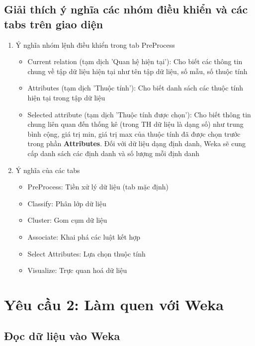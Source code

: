 \documentclass[a4paper, 12pt]{article}
\begin{document}
\subsection{Giải thích ý nghĩa các nhóm điều khiển và các tabs trên giao diện}
\begin{enumerate}
    \item Ý nghĩa nhóm lệnh điều khiển trong tab PreProcess
    \begin{itemize}
        \item Current relation (tạm dịch 'Quan hệ hiện tại'): Cho biết các thông tin chung về tập dữ liệu hiện tại như tên tập dữ liệu, số mẫu, số thuộc tính
        \item Attributes (tạm dịch 'Thuộc tính'): Cho biết danh sách các thuộc tính hiện tại trong tập dữ liệu
        \item Selected attribute (tạm dịch 'Thuộc tính được chọn'): Cho biết thông tin chung liên quan đến thống kê (trong TH dữ liệu là dạng số) như trung bình cộng, giá trị min, giá trị max của thuộc tính đã được chọn trước trong phần \textbf{Attributes}. Đối với dữ liệu dạng định danh, Weka sẽ cung cấp danh sách các định danh và số lượng mỗi định danh
    \end{itemize}

    \item Ý nghĩa của các tabs
    \begin{itemize}
        \item PreProcess: Tiền xử lý dữ liệu (tab mặc định)
        \item Classify: Phân lớp dữ liệu
        \item Cluster: Gom cụm dữ liệu
        \item Associate: Khai phá các luật kết hợp
        \item Select Attributes: Lựa chọn thuộc tính
        \item Visualize: Trực quan hoá dữ liệu
    \end{itemize}
\end{enumerate}

\section{Yêu cầu 2: Làm quen với Weka}

\subsection{Đọc dữ liệu vào Weka}
\end{document}
